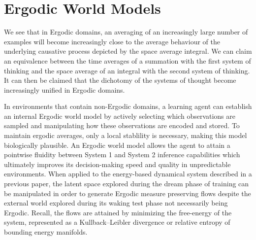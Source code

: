 \documentclass{article}
\begin{document}



\section{Ergodic World Models}


We see that in Ergodic domains, an averaging of an increasingly large number of examples will become increasingly close to the average behaviour of the underlying causative process depicted by the space average integral. We can claim an equivalence between the time averages of a summation with the first system of thinking and the space average of an integral with the second system of thinking. It can then be claimed that the dichotomy of the systems of thought become increasingly unified in Ergodic domains.

In environments that contain non-Ergodic domains, a learning agent can establish an internal Ergodic world model by actively selecting which observations are sampled and manipulating how these observations are encoded and stored. To maintain ergodic averages, only a local stablility is necessary, making this model biologically plausible. An Ergodic world model allows the agent to attain a pointwise fluidity between System 1 and System 2 inference capabilities which ultimately improves its decision-making speed and quality in unpredictable environments. When applied to the energy-based dynamical system described in a previous paper, the latent space explored during the dream phase of training can be manipulated in order to generate Ergodic measure preserving flows despite the external world explored during its waking test phase not necessarily being Ergodic. Recall, the flows are attained by minimizing the free-energy of the system, represented as a Kullback–Leibler divergence or relative entropy of bounding energy manifolds. 
\end{document}
